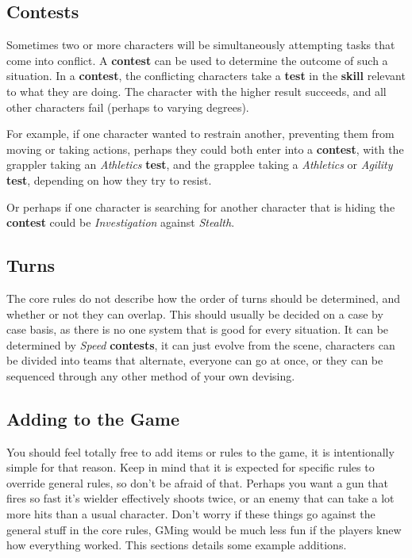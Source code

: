 \documentclass[11pt]{article}
\begin{document}
\begin{multicols}{3}
  \subsection*{Contests}

  Sometimes two or more characters will be simultaneously attempting tasks that come into conflict. A \textbf{contest} can be used to determine the outcome of such a situation. In a \textbf{contest}, the conflicting characters take a \textbf{test} in the \textbf{skill} relevant to what they are doing. The character with the higher result succeeds, and all other characters fail (perhaps to varying degrees).

  For example, if one character wanted to restrain another, preventing them from moving or taking actions, perhaps they could both enter into a \textbf{contest}, with the grappler taking an \textit{Athletics} \textbf{test}, and the grapplee taking a \textit{Athletics} or \textit{Agility} \textbf{test}, depending on how they try to resist.

  Or perhaps if one character is searching for another character that is hiding the \textbf{contest} could be \textit{Investigation} against \textit{Stealth}.

  \subsection*{Turns}

  The core rules do not describe how the order of turns should be determined, and whether or not they can overlap. This should usually be decided on a case by case basis, as there is no one system that is good for every situation. It can be determined by \textit{​Speed} \textbf{contests}, it can just evolve from the scene, characters can be divided into teams that alternate, everyone can go at once, or they can be sequenced through any other method of your own devising.

  \subsection*{Adding to the Game}

  You should feel totally free to add items or rules to the game, it is intentionally simple for that reason. Keep in mind that it is expected for specific rules to override general rules, so don't be afraid of that. Perhaps you want a gun that fires so fast it's wielder effectively shoots twice, or an enemy that can take a lot more hits than a usual character. Don't worry if these things go against the general stuff in the core rules, GMing would be much less fun if the players knew how everything worked. This sections details some example additions.


\end{multicols}
\end{document}
